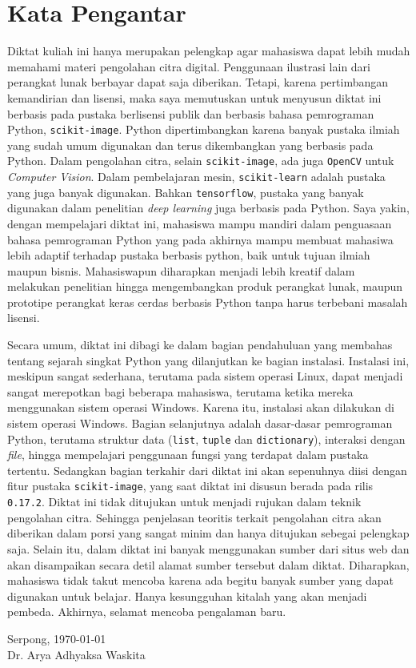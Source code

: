 \chapter*{Kata Pengantar}
Diktat kuliah ini hanya merupakan pelengkap agar mahasiswa dapat lebih mudah memahami materi pengolahan citra digital. Penggunaan ilustrasi lain dari perangkat lunak berbayar dapat saja diberikan. Tetapi, karena pertimbangan kemandirian dan lisensi, maka saya memutuskan untuk menyusun diktat ini berbasis pada pustaka berlisensi publik dan berbasis bahasa pemrograman Python, \texttt{scikit-image}. Python dipertimbangkan karena banyak pustaka ilmiah yang sudah umum digunakan dan terus dikembangkan yang berbasis pada Python. Dalam pengolahan citra, selain \texttt{scikit-image}, ada juga \texttt{OpenCV} untuk \textit{Computer Vision}. Dalam pembelajaran mesin, \texttt{scikit-learn} adalah pustaka yang juga banyak digunakan. Bahkan \texttt{tensorflow}, pustaka yang banyak digunakan dalam penelitian \textit{deep learning} juga berbasis pada Python. Saya yakin, dengan mempelajari diktat ini, mahasiswa mampu mandiri dalam penguasaan bahasa pemrograman Python yang pada akhirnya mampu membuat mahasiwa lebih adaptif terhadap pustaka berbasis python, baik untuk tujuan ilmiah maupun bisnis. Mahasiswapun diharapkan menjadi lebih kreatif dalam melakukan penelitian hingga mengembangkan produk perangkat lunak, maupun prototipe perangkat keras cerdas berbasis Python tanpa harus terbebani masalah lisensi.

Secara umum, diktat ini dibagi ke dalam bagian pendahuluan yang membahas tentang sejarah singkat Python yang dilanjutkan ke bagian instalasi. Instalasi ini, meskipun sangat sederhana, terutama pada sistem operasi Linux, dapat menjadi sangat merepotkan bagi beberapa mahasiswa, terutama ketika mereka menggunakan sistem operasi Windows. Karena itu, instalasi akan dilakukan di sistem operasi Windows. Bagian selanjutnya adalah dasar-dasar pemrograman Python, terutama struktur data (\texttt{list}, \texttt{tuple} dan \texttt{dictionary}), interaksi dengan \textit{file}, hingga mempelajari penggunaan fungsi yang terdapat dalam pustaka tertentu. Sedangkan bagian terkahir dari diktat ini akan sepenuhnya diisi dengan fitur pustaka \texttt{scikit-image}, yang saat diktat ini disusun berada pada rilis \texttt{0.17.2}.
\clearpage
Diktat ini tidak ditujukan untuk menjadi rujukan dalam teknik pengolahan citra. Sehingga penjelasan teoritis terkait pengolahan citra akan diberikan dalam porsi yang sangat minim dan hanya ditujukan sebegai pelengkap saja. Selain itu, dalam diktat ini banyak menggunakan sumber dari situs web dan akan disampaikan secara detil alamat sumber tersebut dalam diktat. Diharapkan, mahasiswa tidak takut mencoba karena ada begitu banyak sumber yang dapat digunakan untuk belajar. Hanya kesungguhan kitalah yang akan menjadi pembeda. Akhirnya, selamat mencoba pengalaman baru. 

\vspace*{2cm}
\begin{flushright}
Serpong, \today\\[0.1cm]
\vspace*{1cm}
Dr. Arya Adhyaksa Waskita

\end{flushright}
